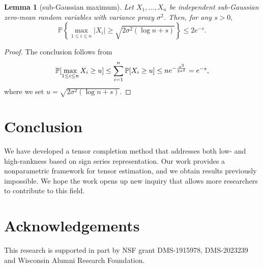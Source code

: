 \documentclass[11pt]{article}
\theoremstyle{plain}
\newtheorem{lem}{Lemma}
\theoremstyle{definition}
\begin{document}
\begin{lem}[sub-Gaussian maximum]\label{lem:subg}
Let $X_1,\ldots,X_n$ be independent sub-Gaussian zero-mean random variables with variance proxy $\sigma^2$. Then, for any $s>0,$
\[\mathbb{P}\left\{\max_{1\leq i\leq n}|X_i|\geq\sqrt{2\sigma^2(\log n +s)}\right\}\leq2 e^{-s}.\]
\end{lem}
\begin{proof}
The conclusion follows from
\begin{align}
\mathbb{P}[\max_{1\leq i\leq n}X_i\geq u] \leq \sum_{i=1}^n\mathbb{P}[X_i\geq u]\leq n e^{-{u^2\over 2\sigma^2}} = e^{-s},
\end{align}
where we set $u = \sqrt{2\sigma^2(\log n+s)}.$
\end{proof}

\section{Conclusion}
We have developed a tensor completion method that addresses both low- and high-rankness based on sign series representation. Our work provides a nonparametric framework for tensor estimation, and we obtain results  previously impossible.  We hope the work opens up new inquiry that allows more researchers to contribute to this field.

\section*{Acknowledgements}
This research is supported in part by NSF grant DMS-1915978, DMS-2023239 and Wisconsin Alumni Research Foundation.




\end{document}
